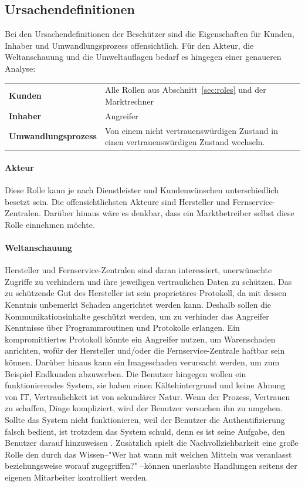 \documentclass[11pt,a4paper]{report}
\begin{document}
\subsection{Ursachendefinitionen}

Bei den Ursachendefinitionen der Beschützer sind die Eigenschaften für Kunden, Inhaber und Umwandlungsprozess offensichtlich. Für den Akteur, die Weltanschauung und die Umweltauflagen bedarf es hingegen einer genaueren Analyse:

\setlength{\tabcolsep}{12pt}
\renewcommand{\arraystretch}{1.5}
\begin{table}[h] %
\begin{tabularx}{\linewidth}{@{}lX@{}}
\textbf{Kunden} & Alle Rollen aus Abschnitt~\ref{sec:roles} und der Marktrechner\\
\textbf{Inhaber} & Angreifer\\
\textbf{Umwandlungsprozess} & 
Von einem nicht vertrauenswürdigen Zustand in einen vertrauenswürdigen Zustand wechseln.\\
\end{tabularx}
\end{table}

\paragraph{Akteur} Diese Rolle kann je nach Dienstleister und Kundenwünschen unterschiedlich besetzt sein. Die offensichtlichsten Akteure sind Hersteller und Fernservice-Zentralen. Darüber hinaus wäre es denkbar, dass ein Marktbetreiber selbst diese Rolle einnehmen möchte.

\paragraph{Weltanschauung} Hersteller und Fernservice-Zentralen sind daran interessiert, unerwünschte Zugriffe zu verhindern und ihre jeweiligen vertraulichen Daten zu schützen. Das zu schützende Gut des Hersteller ist sein proprietäres Protokoll, da mit dessen Kenntnis unbemerkt Schaden angerichtet werden kann. Deshalb sollen die Kommunikationsinhalte geschützt werden, um zu verhinder das Angreifer Kenntnisse über Programmroutinen und Protokolle erlangen. Ein kompromittiertes Protokoll könnte ein Angreifer nutzen, um Warenschaden anrichten, wofür der Hersteller und/oder die Fernservice-Zentrale haftbar sein können. Darüber hinaus kann ein Imageschaden verursacht werden, um zum Beispiel Endkunden abzuwerben. Die Benutzer hingegen wollen ein funktionierendes System, sie haben einen Kältehintergrund und keine Ahnung von IT, Vertraulichkeit ist von sekundärer Natur. Wenn der Prozess, Vertrauen zu schaffen, Dinge kompliziert, wird der Benutzer versuchen ihn zu umgehen. Sollte das System nicht funktionieren, weil der Benutzer die Authentifizierung falsch bedient, ist trotzdem das System schuld, denn es ist seine Aufgabe, den Benutzer darauf hinzuweisen \cite[s.~5]{gutmann}. Zusätzlich spielt die Nachvollziehbarkeit eine große Rolle den durch das Wissen--"Wer hat wann mit welchen Mitteln was veranlasst beziehungsweise worauf zugegriffen?" \cite{bsi_m2110}--können unerlaubte Handlungen seitens der eigenen Mitarbeiter kontrolliert werden.
\end{document}
